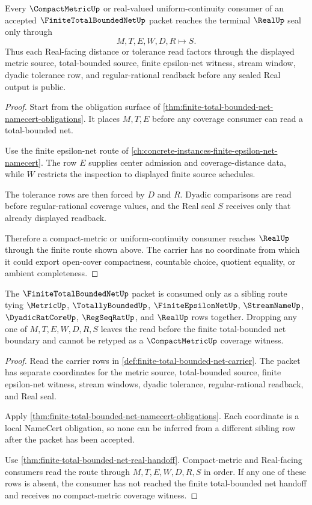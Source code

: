 \begin{theorem}
\label{thm:finite-total-bounded-net-real-handoff}
Every $\CompactMetricUp$ or real-valued uniform-continuity consumer of an accepted $\FiniteTotalBoundedNetUp$ packet reaches the terminal $\RealUp$ seal only through
$$
M,T,E,W,D,R \longmapsto S .
$$
Thus each Real-facing distance or tolerance read factors through the displayed metric source, total-bounded source, finite epsilon-net witness, stream window, dyadic tolerance row, and regular-rational readback before any sealed Real output is public.
\end{theorem}
\begin{proof}
Start from the obligation surface of \autoref{thm:finite-total-bounded-net-namecert-obligations}. It places $M,T,E$ before any coverage consumer can read a total-bounded net.

Use the finite epsilon-net route of \autoref{ch:concrete-instances-finite-epsilon-net-namecert}. The row $E$ supplies center admission and coverage-distance data, while $W$ restricts the inspection to displayed finite source schedules.

The tolerance rows are then forced by $D$ and $R$. Dyadic comparisons are read before regular-rational coverage values, and the Real seal $S$ receives only that already displayed readback.

Therefore a compact-metric or uniform-continuity consumer reaches $\RealUp$ through the finite route shown above. The carrier has no coordinate from which it could export open-cover compactness, countable choice, quotient equality, or ambient completeness.
\end{proof}

\begin{theorem}
\label{thm:finite-total-bounded-net-sibling-dependency}
The $\FiniteTotalBoundedNetUp$ packet is consumed only as a sibling route tying $\MetricUp$, $\TotallyBoundedUp$, $\FiniteEpsilonNetUp$, $\StreamNameUp$, $\DyadicRatCoreUp$, $\RegSeqRatUp$, and $\RealUp$ rows together. Dropping any one of $M,T,E,W,D,R,S$ leaves the read before the finite total-bounded net boundary and cannot be retyped as a $\CompactMetricUp$ coverage witness.
\end{theorem}
\begin{proof}
Read the carrier rows in \autoref{def:finite-total-bounded-net-carrier}. The packet has separate coordinates for the metric source, total-bounded source, finite epsilon-net witness, stream windows, dyadic tolerance, regular-rational readback, and Real seal.

Apply \autoref{thm:finite-total-bounded-net-namecert-obligations}. Each coordinate is a local NameCert obligation, so none can be inferred from a different sibling row after the packet has been accepted.

Use \autoref{thm:finite-total-bounded-net-real-handoff}. Compact-metric and Real-facing consumers read the route through $M,T,E,W,D,R,S$ in order. If any one of these rows is absent, the consumer has not reached the finite total-bounded net handoff and receives no compact-metric coverage witness.
\end{proof}

